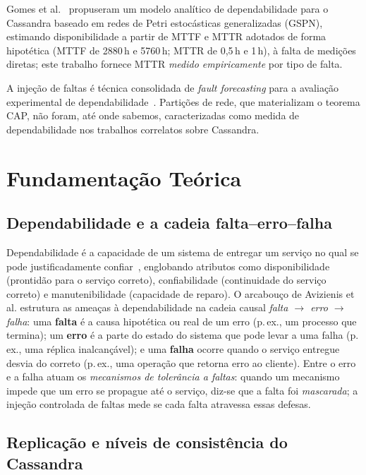 \documentclass[runningheads]{llncs}
\begin{document}
Gomes et al.~\cite{gomes2019} propuseram um modelo analítico de dependabilidade
para o Cassandra baseado em redes de Petri estocásticas generalizadas (GSPN),
estimando disponibilidade a partir de MTTF e MTTR adotados de forma hipotética
(MTTF de 2880\,h e 5760\,h; MTTR de 0,5\,h e 1\,h), à falta de medições diretas;
este trabalho fornece MTTR \emph{medido empiricamente} por tipo de falta.

A injeção de faltas é técnica consolidada de \emph{fault forecasting} para a
avaliação experimental de
dependabilidade~\cite{avizienis2004basic,borges2025,silva2025models}. Partições
de rede, que materializam o teorema CAP, não foram, até onde sabemos,
caracterizadas como medida de dependabilidade nos trabalhos correlatos sobre
Cassandra.

\section{Fundamentação Teórica}
\label{sec:background}

\subsection{Dependabilidade e a cadeia falta--erro--falha}

Dependabilidade é a capacidade de um sistema de entregar um serviço no qual se
pode justificadamente confiar~\cite{avizienis2004basic}, englobando atributos
como disponibilidade (prontidão para o serviço correto), confiabilidade
(continuidade do serviço correto) e manutenibilidade (capacidade de reparo). O
arcabouço de Avizienis et al. estrutura as ameaças à dependabilidade na cadeia
causal \emph{falta $\rightarrow$ erro $\rightarrow$ falha}: uma \textbf{falta} é a
causa hipotética ou real de um erro (p.\,ex., um processo que termina); um
\textbf{erro} é a parte do estado do sistema que pode levar a uma falha (p.\,ex., uma
réplica inalcançável); e uma \textbf{falha} ocorre quando o serviço entregue
desvia do correto (p.\,ex., uma operação que retorna erro ao cliente). Entre o erro e a falha atuam os \emph{mecanismos de tolerância a
faltas}: quando um mecanismo impede que um erro se propague até o serviço,
diz-se que a falta foi \emph{mascarada}; a injeção controlada de faltas mede se
cada falta atravessa essas defesas.

\subsection{Replicação e níveis de consistência do Cassandra}
\end{document}
